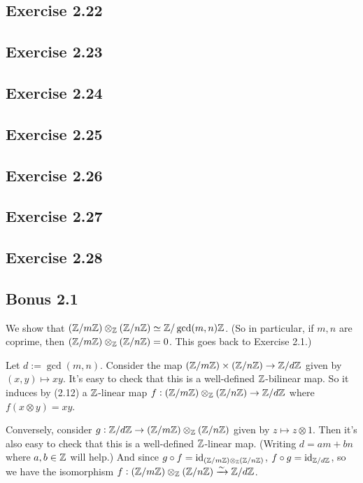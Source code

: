 \documentclass[../A&M.tex]{subfiles}
\begin{document}
\subsection*{Exercise 2.22}

\subsection*{Exercise 2.23}

\subsection*{Exercise 2.24}

\subsection*{Exercise 2.25}

\subsection*{Exercise 2.26}

\subsection*{Exercise 2.27}

\subsection*{Exercise 2.28}

\subsection*{Bonus 2.1} \label{Bonus 2.1}

We show that $(\mathbb{Z}/m\mathbb{Z}) \otimes_{\mathbb{Z}} (\mathbb{Z}/n\mathbb{Z}) \simeq \mathbb{Z}/\gcd(m,n)\mathbb{Z}$. (So in particular, if $m,n$ are coprime, then $(\mathbb{Z}/m\mathbb{Z}) \otimes_{\mathbb{Z}} (\mathbb{Z}/n\mathbb{Z}) = 0$. This goes back to Exercise 2.1.)

Let $d:=\gcd(m,n)$. Consider the map $(\mathbb{Z}/m\mathbb{Z}) \times (\mathbb{Z}/n\mathbb{Z}) \to \mathbb{Z}/d\mathbb{Z}$ given by $(x,y) \mapsto xy$. It's easy to check that this is a well-defined $\mathbb{Z}$-bilinear map. So it induces by (2.12) a $\mathbb{Z}$-linear map $f: (\mathbb{Z}/m\mathbb{Z}) \otimes_{\mathbb{Z}} (\mathbb{Z}/n\mathbb{Z}) \to \mathbb{Z}/d\mathbb{Z}$ where $f(x \otimes y) = xy$. 

Conversely, consider $g: \mathbb{Z}/d\mathbb{Z} \to (\mathbb{Z}/m\mathbb{Z}) \otimes_{\mathbb{Z}} (\mathbb{Z}/n\mathbb{Z})$ given by $z \mapsto z \otimes 1$. Then it's also easy to check that this is a well-defined $\mathbb{Z}$-linear map. (Writing $d=am+bn$ where $a,b\in\mathbb{Z}$ will help.) And since $g \circ f = \operatorname{id}_{(\mathbb{Z}/m\mathbb{Z}) \otimes_{\mathbb{Z}} (\mathbb{Z}/n\mathbb{Z})}$, $f \circ g = \operatorname{id}_{\mathbb{Z}/d\mathbb{Z}}$, so we have the isomorphism $f : (\mathbb{Z}/m\mathbb{Z}) \otimes_{\mathbb{Z}} (\mathbb{Z}/n\mathbb{Z}) \xrightarrow{\sim} \mathbb{Z}/d\mathbb{Z}$.
\end{document}
